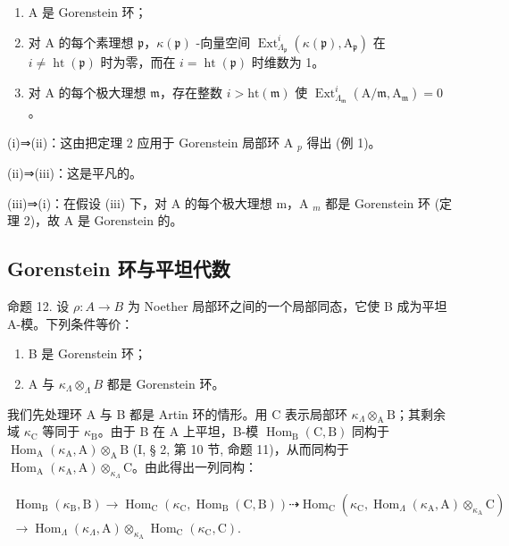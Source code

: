 \begin{enumerate}
\def\labelenumi{(\roman{enumi})}
\item
  A 是 Gorenstein 环；
\item
  对 A 的每个素理想 \(\mathfrak{p}\)，\(\kappa(\mathfrak{p})\) -向量空间 \(\operatorname{Ext}_{\Lambda_{\mathfrak{p}}}^{i}(\kappa(\mathfrak{p}),\mathrm{A}_{\mathfrak{p}})\) 在 \(i \neq \operatorname{ht}(\mathfrak{p})\) 时为零，而在 \(i = \operatorname{ht}(\mathfrak{p})\) 时维数为 1。
\item
  对 A 的每个极大理想 \(\mathfrak{m}\)，存在整数 \(i > \mathrm{ht}(\mathfrak{m})\) 使 \(\operatorname{Ext}_{\Lambda_{\mathfrak{m}}}^{i}(\mathrm{A}/\mathfrak{m},\mathrm{A}_{\mathfrak{m}}) = 0\) 。
\end{enumerate}

(i)⇒(ii)：这由把定理 2 应用于 Gorenstein 局部环 A \(_{p}\) 得出 (例 1)。

(ii)⇒(iii)：这是平凡的。

(iii)⇒(i)：在假设 (iii) 下，对 A 的每个极大理想 m，A \(_{m}\) 都是 Gorenstein 环 (定理 2)，故 A 是 Gorenstein 的。

\subsection{Gorenstein 环与平坦代数}

命题 12. 设 \(\rho: A \to B\) 为 Noether 局部环之间的一个局部同态，它使 B 成为平坦 A-模。下列条件等价：

\begin{enumerate}
\def\labelenumi{(\roman{enumi})}
\item
  B 是 Gorenstein 环；
\item
  A 与 \(\kappa_{\Lambda} \otimes_{\Lambda} B\) 都是 Gorenstein 环。
\end{enumerate}

我们先处理环 A 与 B 都是 Artin 环的情形。用 C 表示局部环 \(\kappa_{\Lambda} \otimes_{\mathrm{A}} \mathrm{B}\)；其剩余域 \(\kappa_{\mathrm{C}}\) 等同于 \(\kappa_{\mathrm{B}}\)。由于 B 在 A 上平坦，B-模 \(\operatorname{Hom}_{\mathrm{B}}(\mathrm{C}, \mathrm{B})\) 同构于 \(\operatorname{Hom}_{\mathrm{A}}(\kappa_{\mathrm{A}}, \mathrm{A}) \otimes_{\mathrm{A}} \mathrm{B}\) (I, § 2, 第 10 节, 命题 11)，从而同构于 \(\operatorname{Hom}_{\mathrm{A}}(\kappa_{\mathrm{A}}, \mathrm{A}) \otimes_{\kappa_{\Lambda}} \mathrm{C}\)。由此得出一列同构：

\[
\begin{array}{c} \operatorname{Hom} _ {\mathrm{B}} (\kappa_ {\mathrm{B}}, \mathrm{B}) \longrightarrow \operatorname{Hom} _ {\mathrm{C}} (\kappa_ {\mathrm{C}}, \operatorname{Hom} _ {\mathrm{B}} (\mathrm{C}, \mathrm{B})) \dashrightarrow \operatorname{Hom} _ {\mathrm{C}} (\kappa_ {\mathrm{C}}, \operatorname{Hom} _ {\Lambda} (\kappa_ {\mathrm{A}}, \mathrm{A}) \otimes_ {\kappa_ {\mathrm{A}}} \mathrm{C}) \\ \longrightarrow \operatorname{Hom} _ {\Lambda} (\kappa_ {\Lambda}, \mathrm{A}) \otimes_ {\kappa_ {\mathrm{A}}} \operatorname{Hom} _ {\mathrm{C}} (\kappa_ {\mathrm{C}}, \mathrm{C}). \end{array}
\]

